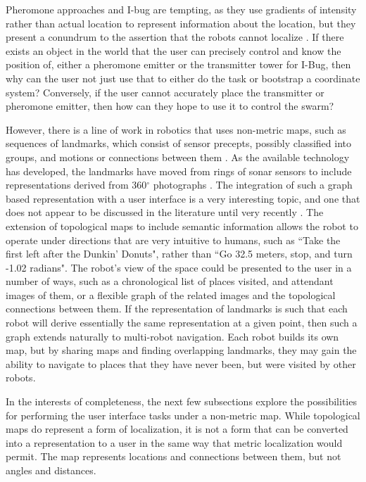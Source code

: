 Pheromone approaches and I-bug are tempting, as they use gradients of intensity rather than actual location to represent information about the location, but they present a conundrum to the assertion that the robots cannot localize \citep{taylor2009bug}. 
If there exists an object in the world that the user can precisely control and know the position of, either a pheromone emitter or the transmitter tower for I-Bug, then why can the user not just use that to either do the task or bootstrap a coordinate system?
Conversely, if the user cannot accurately place the transmitter or pheromone emitter, then how can they hope to use it to control the swarm? 

However, there is a line of work in robotics that uses non-metric maps, such as sequences of landmarks, which consist of sensor precepts, possibly classified into groups, and motions or connections between them \citep{mataric1991navigating, franz1998learning}. 
As the available technology has developed, the landmarks have moved from rings of sonar sensors to include representations derived from 360$^\circ$ photographs \citep{tapus2005incremental, goedeme2007omnidirectional}. 
The integration of such a graph based representation with a user interface is a very interesting topic, and one that does not appear to be discussed in the literature until very recently \citep{landsiedel2018semantic}. 
The extension of topological maps to include semantic information allows the robot to operate under directions that are very intuitive to humans, such as ``Take the first left after the Dunkin' Donuts", rather than ``Go 32.5 meters, stop, and turn -1.02 radians".
The robot's view of the space could be presented to the user in a number of ways, such as a chronological list of places visited, and attendant images of them, or a flexible graph of the related images and the topological connections between them. 
If the representation of landmarks is such that each robot will derive essentially the same representation at a given point, then such a graph extends naturally to multi-robot navigation. 
Each robot builds its own map, but by sharing maps and finding overlapping landmarks, they may gain the ability to navigate to places that they have never been, but were visited by other robots. 

In the interests of completeness, the next few subsections explore the possibilities for performing the user interface tasks under a non-metric map. 
While topological maps do represent a form of localization, it is not a form that can be converted into a representation to a user in the same way that metric localization would permit. 
The map represents locations and connections between them, but not angles and distances. 

